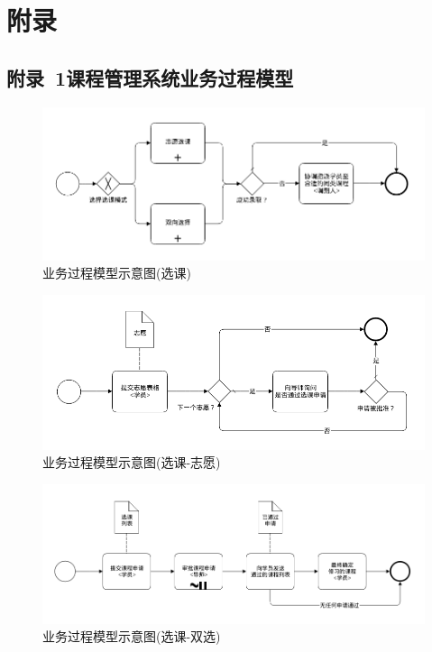 \chapter*{附\qquad 录}

\section*{附录~1\quad	课程管理系统业务过程模型}
\label{sec:appendix-bpm}

\begin{figure}[!hbp]
  \begin{center}
    \includegraphics[width=\textwidth]{figures/diagram-bpm-cs.png}
    \caption{业务过程模型示意图(选课)\label{BPMCourseRegister}}
  \end{center}
\end{figure}

\begin{figure}[!hbp]
  \begin{center}
    \includegraphics[width=\textwidth]{figures/diagram-bpm-cs-preference.png}
    \caption{业务过程模型示意图(选课-志愿)\label{BPMCourseRegisterP}}
  \end{center}
\end{figure}

\begin{figure}[!hbp]
  \begin{center}
    \includegraphics[width=\textwidth]{figures/diagram-bpm-cs-dual.png}
    \caption{业务过程模型示意图(选课-双选)\label{BPMCourseRegisterD}}
  \end{center}
\end{figure}

